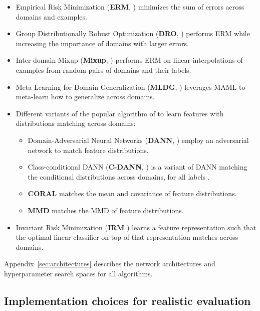 \documentclass{article}
\begin{document}
\begin{itemize}
    \item Empirical Risk Minimization (\textbf{ERM}, \citet{vapnik1998statistical}) minimizes the sum of errors across domains and examples.
    \item Group Distributionally Robust Optimization (\textbf{DRO}, \citet{sagawa2019distributionally}) performs ERM while increasing the importance of domains with larger errors. 
    \item Inter-domain Mixup (\textbf{Mixup}, \citet{xu2019adversarial, yan2020improve, wang2020h}) performs ERM on linear interpolations of examples from random pairs of domains and their labels.
    \item Meta-Learning for Domain Generalization (\textbf{MLDG}, \citet{li2018learning}) leverages MAML \citep{finn2017model} to meta-learn how to generalize across domains. 
    \item Different variants of the popular algorithm of \citet{ganin2016domain} to learn features  with distributions matching across domains:
    \begin{itemize}
        \item Domain-Adversarial Neural Networks (\textbf{DANN}, \citet{ganin2016domain}) employ  an adversarial network to match feature distributions.
        \item Class-conditional DANN (\textbf{C-DANN}, \citet{li2018deep}) is a variant of DANN matching the conditional distributions  across domains, for all labels .
        \item \textbf{CORAL} \citep{sun2016deep} matches the mean and covariance of feature distributions. 
        \item \textbf{MMD} \citep{li2018domain} matches the MMD \citep{gretton2012kernel} of feature distributions.
    \end{itemize}
    \item Invariant Risk Minimization (\textbf{IRM} \citep{arjovsky2019invariant}) learns a feature representation  such that the optimal linear classifier on top of that representation matches across domains.
\end{itemize}

Appendix~\ref{sec:architectures} describes the network architectures and hyperparameter search spaces for all algorithms.

\subsection{Implementation choices for realistic evaluation}
\end{document}

